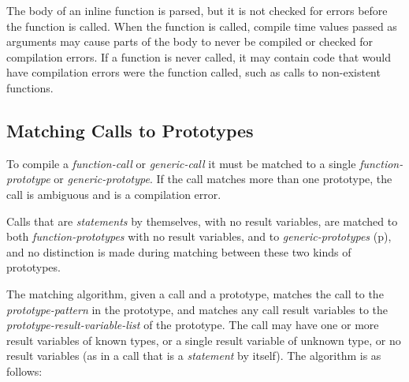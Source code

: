 \documentclass[12pt]{article}
\newcommand{\pagref}[1]{p\pageref{#1}}
\begin{document}
The body of an inline function is parsed, but it is not checked for
errors before the function is called.  When the function is called,
compile time values passed as arguments may cause parts of the body
to never be compiled or checked for compilation errors.  If a function
is never called, it may contain code that would have compilation errors
were the function called, such as calls to non-existent functions.

\subsection{Matching Calls to Prototypes}
\label{MATCHING-CALLS-TO-PROTOTYPES}

To compile a {\em function-call}
or {\em generic-call} it must be matched to a
single {\em function-prototype} or {\em generic-prototype}.
If the call matches more than one
prototype, the call is ambiguous and is a compilation error.

Calls that are {\em statements} by themselves, with no
result variables, are matched to both {\em function-prototypes}
with no result variables, and to
{\em generic-prototypes} (\pagref{GENERIC-PROTOTYPE}),
and no distinction is made during
matching between these two kinds of prototypes.

The matching algorithm, given a call and a
prototype, matches the call
to the {\em prototype-pattern} in the prototype,
and matches any call result variables to
the {\em prototype-result-variable-list}
of the prototype.  The call may have one or more result
variables of known types, or a single result variable of unknown
type, or no result variables (as in a call that is
a {\em statement} by itself).  The algorithm is as follows:
\end{document}
